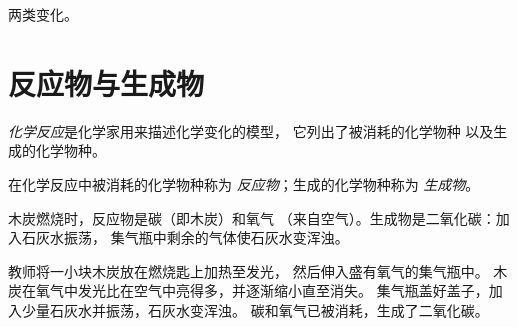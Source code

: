 \begin{omfigure}

{\small 两类变化。}
\end{omfigure}

\section{反应物与生成物}

\begin{definition}[化学反应]\label{def:g7:chemical-reactions:reaction}
\emph{化学反应}是化学家用来描述化学变化的模型，
它列出了被消耗的化学物种
以及生成的化学物种。
\end{definition}

\begin{definition}[反应物与生成物]\label{def:g7:chemical-reactions:reactant}
在化学反应中被消耗的化学物种称为
\emph{反应物}；生成的化学物种称为
\emph{生成物}。
\end{definition}

\begin{example}[碳在氧气中燃烧]\label{ex:g7:chemical-reactions:carbon}
木炭燃烧时，反应物是碳（即木炭）和氧气
（来自空气）。生成物是二氧化碳：加入石灰水振荡，
集气瓶中剩余的气体使石灰水变浑浊。
\end{example}

\begin{inthelab}[木炭在氧气中]
教师将一小块木炭放在燃烧匙上加热至发光，
然后伸入盛有氧气的集气瓶中。
木炭在氧气中发光比在空气中亮得多，并逐渐缩小直至消失。
集气瓶盖好盖子，加入少量石灰水并振荡，石灰水变浑浊。
碳和氧气已被消耗，生成了二氧化碳。
\end{inthelab}

